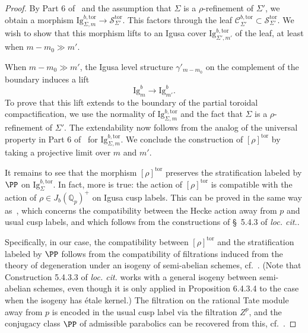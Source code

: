 \documentclass[letterpaper,11pt]{amsart}
\begin{document}
\begin{proof}
By Part 6 of~\cite[Theorem 6.4.1.1]{lan-thesis} and the assumption that $\Sigma$ is a $\rho$-refinement of $\Sigma'$, we obtain a morphism $\mathrm{Ig}^{b, \mathrm{tor}}_{\Sigma, m}\to \mathscr{S}^{\mathrm{tor}}_{\Sigma'}$. This factors through the leaf $\mathscr{C}^{b,\mathrm{tor}}_{\Sigma'}\subset \mathscr{S}^{\mathrm{tor}}_{\Sigma'}$. We wish to show that this morphism lifts to an Igusa cover $\mathrm{Ig}^{b,\mathrm{tor}}_{\Sigma', m'}$ of the leaf, at least when $m-m_0\gg m'$. 

When $m-m_0\gg m'$, the Igusa level structure $\gamma'_{m-m_0}$ on the complement of the boundary induces a lift
\[
\mathrm{Ig}^b_m\to \mathrm{Ig}^b_{m'}.
\]
To prove that this lift extends to the boundary of the partial toroidal compactification, we use the normality of $\mathrm{Ig}^{b,\mathrm{tor}}_{\Sigma, m}$ and the fact that $\Sigma$ is a $\rho$-refinement of $\Sigma'$. The extendability now follows from the analog of the universal property in Part 6 of~\cite[Theorem 6.4.1.1]{lan-thesis} for $\mathrm{Ig}^{b,\mathrm{tor}}_{\Sigma, m}$. We conclude the construction of $[\rho]^{\mathrm{tor}}$ by taking a projective limit over $m$ and $m'$. 

It remains to see that the morphism $[\rho]^{\mathrm{tor}}$ preserves the stratification labeled by $\PP$ on $\mathrm{Ig}^{b,\mathrm{tor}}_{\Sigma}$. In fact, more is true: the action of $[\rho]^{\mathrm{tor}}$ is compatible with the action of $\rho\in J_b(\mathbb{Q}_p)^+$ on Igusa cusp labels. This can be proved in the same way as~\cite[Proposition 6.4.3.4]{lan-thesis}, which concerns the compatibility between the Hecke action away from $p$ and usual cusp labels, and which follows from the constructions of \S~5.4.3 of \emph{loc. cit.}. 

Specifically, in our case, the compatibility between $[\rho]^{\mathrm{tor}}$ and the stratification labeled by $\PP$ follows from the compatibility of filtrations induced from the theory of degeneration under an isogeny of semi-abelian schemes, cf.~\cite[Construction 5.4.3.3]{lan-thesis}.
(Note that Construction 5.4.3.3 of \emph{loc. cit.} works with a general isogeny between semi-abelian schemes, even though it is only applied in Proposition 6.4.3.4 to the case when  the isogeny has \'etale kernel.) 
The  filtration on the rational Tate module away from $p$ is encoded in the usual cusp label via the filtration $Z^p$,  and the conjugacy class $\PP$ of admissible parabolics can be recovered from this, cf.~\cite[\S A.4, A.5]{Lan-ANT}. 



\end{proof}
\end{document}
